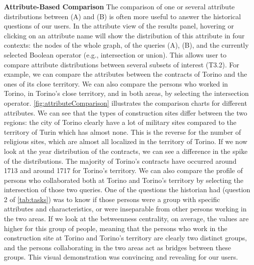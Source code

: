 \noindent\textbf{Attribute-Based Comparison}
The comparison of one or several attribute distributions between (A) and (B) is often more useful to answer the historical questions of our users. In the attribute view of the results panel, hovering or clicking on an attribute name will show the distribution of this attribute in four contexts: the nodes of the whole graph, of the queries (A), (B), and the currently selected Boolean operator (e.g., intersection or union). This allows user to compare attribute distributions between several subsets of interest (T3.2). For example, we can compare the attributes between the contracts of Torino and the ones of its close territory. We can also compare the persons who worked in Torino, in Torino's close territory, and in both areas, by selecting the intersection operator.
\autoref{fig:attributeComparison} illustrates the comparison charts for different attributes.  We can see that the types of construction sites differ between the two regions: the city of Torino clearly have a lot of military sites compared to the territory of Turin which has almost none. This is the reverse for the number of religious sites, which are almost all localized in the territory of Torino. If we now look at the year distribution of the contracts, we can see a difference in the spike of the distributions. The majority of Torino's contracts have occurred around 1713 and around 1717 for Torino's territory.
We can also compare the profile of persons who collaborated both at Torino and Torino's territory by selecting the intersection of those two queries. One of the questions the historian had (question 2 of \autoref{tab:tasks}) was to know if those persons were a group with specific attributes and characteristics, or were inseparable from other persons working in the two areas. If we look at the betweenness centrality, on average, the values are higher for this group of people, meaning that the persons who work in the construction site at Torino and Torino's territory are clearly two distinct groups, and the persons collaborating in the two areas act as bridges between these groups.
This visual demonstration was convincing and revealing for our users.

